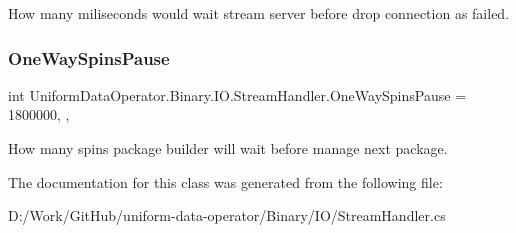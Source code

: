 How many miliseconds would wait stream server before drop connection as failed. 

\mbox{\label{class_uniform_data_operator_1_1_binary_1_1_i_o_1_1_stream_handler_a1b6540f8d3bf3c455caabc0f007f6702}} 
\subsubsection{\texorpdfstring{One\+Way\+Spins\+Pause}{OneWaySpinsPause}}
{\footnotesize\ttfamily int Uniform\+Data\+Operator.\+Binary.\+I\+O.\+Stream\+Handler.\+One\+Way\+Spins\+Pause = 1800000\hspace{0.3cm}{\ttfamily [static]}, {\ttfamily [get]}, {\ttfamily [set]}}



How many spins package builder will wait before manage next package. 



The documentation for this class was generated from the following file\+:\begin{DoxyCompactItemize}
\item 
D\+:/\+Work/\+Git\+Hub/uniform-\/data-\/operator/\+Binary/\+I\+O/Stream\+Handler.\+cs\end{DoxyCompactItemize}

